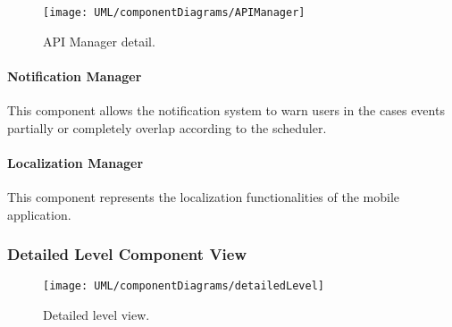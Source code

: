 		\begin{figure}[H]
			\centering
			\texttt{[image: UML/componentDiagrams/APIManager]}
			\caption{API Manager detail.}
			\label{APIManagerDetail}
		\end{figure}
	
	
	\paragraph{Notification Manager}
		This component allows the notification system to warn users in the cases events partially or completely overlap according to the scheduler.

	\paragraph{Localization Manager}
		This component represents the localization functionalities of the mobile application.


\subsubsection{Detailed Level Component View}

	\begin{landscape}
		\begin{figure}
			\texttt{[image: UML/componentDiagrams/detailedLevel]}
			\centering
			\caption{Detailed level view.}
			\label{detailedHighLevel}
		\end{figure}
	\end{landscape}

